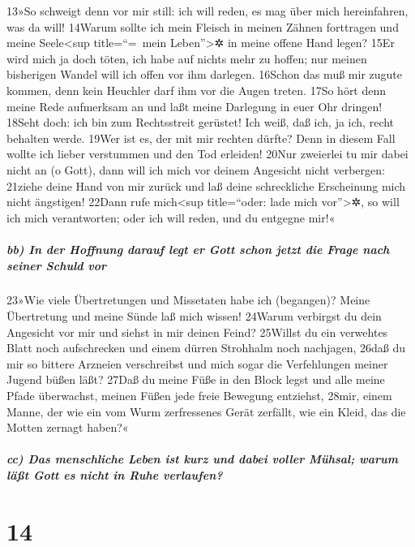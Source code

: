 13»So schweigt denn vor mir still: ich will reden, es mag über mich
hereinfahren, was da will! 14Warum sollte ich mein Fleisch in meinen
Zähnen forttragen und meine Seele\textless sup title=``=~mein
Leben''\textgreater✲ in meine offene Hand legen? 15Er wird mich ja doch
töten, ich habe auf nichts mehr zu hoffen; nur meinen bisherigen Wandel
will ich offen vor ihm darlegen. 16Schon das muß mir zugute kommen, denn
kein Heuchler darf ihm vor die Augen treten. 17So hört denn meine Rede
aufmerksam an und laßt meine Darlegung in euer Ohr dringen! 18Seht doch:
ich bin zum Rechtsstreit gerüstet! Ich weiß, daß ich, ja ich, recht
behalten werde. 19Wer ist es, der mit mir rechten dürfte? Denn in diesem
Fall wollte ich lieber verstummen und den Tod erleiden! 20Nur zweierlei
tu mir dabei nicht an (o Gott), dann will ich mich vor deinem Angesicht
nicht verbergen: 21ziehe deine Hand von mir zurück und laß deine
schreckliche Erscheinung mich nicht ängstigen! 22Dann rufe
mich\textless sup title=``oder: lade mich vor''\textgreater✲, so will
ich mich verantworten; oder ich will reden, und du entgegne mir!«

\hypertarget{bb-in-der-hoffnung-darauf-legt-er-gott-schon-jetzt-die-frage-nach-seiner-schuld-vor}{%
\subparagraph{bb) In der Hoffnung darauf legt er Gott schon jetzt die
Frage nach seiner Schuld
vor}\label{bb-in-der-hoffnung-darauf-legt-er-gott-schon-jetzt-die-frage-nach-seiner-schuld-vor}}

23»Wie viele Übertretungen und Missetaten habe ich (begangen)? Meine
Übertretung und meine Sünde laß mich wissen! 24Warum verbirgst du dein
Angesicht vor mir und siehst in mir deinen Feind? 25Willst du ein
verwehtes Blatt noch aufschrecken und einem dürren Strohhalm noch
nachjagen, 26daß du mir so bittere Arzneien verschreibst und mich sogar
die Verfehlungen meiner Jugend büßen läßt? 27Daß du meine Füße in den
Block legst und alle meine Pfade überwachst, meinen Füßen jede freie
Bewegung entziehst, 28mir, einem Manne, der wie ein vom Wurm
zerfressenes Gerät zerfällt, wie ein Kleid, das die Motten zernagt
haben?«

\hypertarget{cc-das-menschliche-leben-ist-kurz-und-dabei-voller-muxfchsal-warum-luxe4uxdft-gott-es-nicht-in-ruhe-verlaufen}{%
\subparagraph{cc) Das menschliche Leben ist kurz und dabei voller
Mühsal; warum läßt Gott es nicht in Ruhe
verlaufen?}\label{cc-das-menschliche-leben-ist-kurz-und-dabei-voller-muxfchsal-warum-luxe4uxdft-gott-es-nicht-in-ruhe-verlaufen}}

\hypertarget{section-13}{%
\section{14}\label{section-13}}


